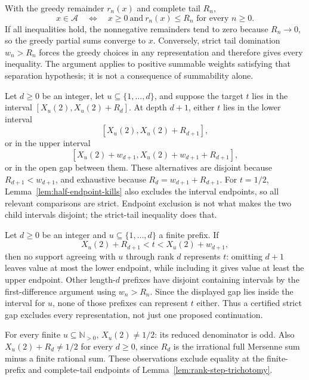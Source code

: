 \begin{thm}
\label{thm:greedy-survival-catalogue}
With the greedy remainder $r_n(x)$ and complete tail $R_n$,
\[
 x\in\mathcal A\quad\Longleftrightarrow\quad
 x\ge0\ \text{and}\ r_n(x)\le R_n\text{ for every }n\ge0.
\]
If all inequalities hold, the nonnegative remainders tend to zero
because $R_n\to0$, so the greedy partial sums converge to $x$.
Conversely, strict tail domination $w_n>R_n$ forces the greedy
choices in any representation and therefore gives every inequality.
The argument applies to positive summable weights satisfying that
separation hypothesis; it is not a consequence of summability alone.
\end{thm}

\begin{lem}
\label{lem:rank-step-trichotomy}
Let $d\ge0$ be an integer, let $u\subseteq\{1,\ldots,d\}$, and suppose the target $t$ lies
in the interval
$[X_u(2),X_u(2)+R_d]$.
At depth $d+1$, either $t$ lies in the lower interval
\[
 [X_u(2),X_u(2)+R_{d+1}],
\]
or in the upper interval
\[
 [X_u(2)+w_{d+1},X_u(2)+w_{d+1}+R_{d+1}],
\]
or in the open gap between them.  These alternatives are disjoint
because $R_{d+1}<w_{d+1}$, and exhaustive because
$R_d=w_{d+1}+R_{d+1}$.
For $t=1/2$, Lemma~\ref{lem:half-endpoint-kills} also excludes
the interval endpoints, so all relevant comparisons are strict.
Endpoint exclusion is not what makes the two child intervals
disjoint; the strict-tail inequality does that.
\end{lem}

\begin{lem}
\label{lem:fatal-gap-exclusion}
Let $d\ge0$ be an integer and $u\subseteq\{1,\ldots,d\}$ a finite prefix.  If
\[
 X_u(2)+R_{d+1}<t<X_u(2)+w_{d+1},
\]
then no support agreeing with $u$ through rank $d$ represents $t$:
omitting $d+1$ leaves value at most the lower endpoint, while
including it gives value at least the upper endpoint.
Other length-$d$ prefixes have disjoint containing intervals by
the first-difference argument using $w_n>R_n$.  Since the displayed
gap lies inside the interval for $u$, none of those prefixes can
represent $t$ either.  Thus a certified strict gap excludes every
representation, not just one proposed continuation.
\end{lem}

\begin{lem}
\label{lem:half-endpoint-kills}
For every finite $u\subseteq\mathbb N_{>0}$,
$X_u(2)\ne1/2$: its reduced denominator is odd.
Also $X_u(2)+R_d\ne1/2$ for every $d\ge0$, since $R_d$
is the irrational full Mersenne sum minus a finite rational sum.
These observations exclude equality at the finite-prefix and
complete-tail endpoints of Lemma~\ref{lem:rank-step-trichotomy}.
\end{lem}


